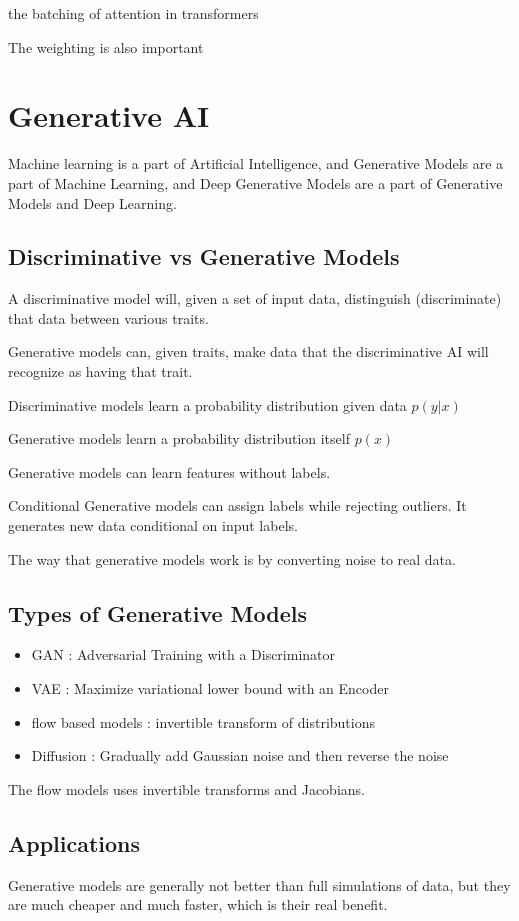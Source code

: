 \documentclass[fleqn]{report}
\begin{document}
the batching of attention in transformers 

The weighting is also important 

\chapter{Generative AI}
Machine learning is a part of Artificial Intelligence, and 
Generative Models are a part of Machine Learning, and Deep Generative Models 
are a part of Generative Models and Deep Learning. 

\section{Discriminative vs Generative Models}
A discriminative model will, given a set of input data, distinguish (discriminate)
that data between various traits. 

Generative models can, given traits, make data that the discriminative AI 
will recognize as having that trait. 

Discriminative models learn a probability distribution given data $p(y | x)$ 

Generative models learn a probability distribution itself $p(x)$

Generative models can learn features without labels. 

Conditional Generative models can assign 
labels while rejecting outliers. It generates new data conditional 
on input labels. 

The way that generative models work is by converting noise to real data. 

\section{Types of Generative Models}
\begin{itemize}
    \item 
    GAN : Adversarial Training with a Discriminator 
    \item 
    VAE : Maximize variational lower bound with an Encoder 
    \item 
    flow based models : invertible transform of distributions 
    \item 
    Diffusion : Gradually add Gaussian noise and then reverse the noise 
\end{itemize}

The flow models uses invertible transforms and Jacobians. 

\section{Applications}
Generative models are generally not better than full simulations of data, but 
they are much cheaper and much faster, which is their real benefit. 
\end{document}
